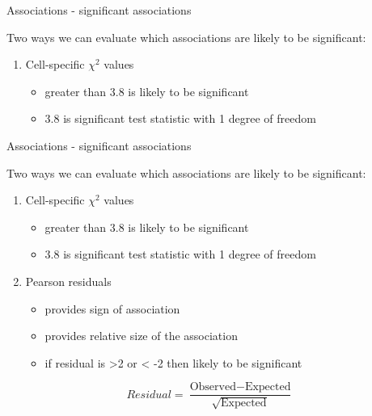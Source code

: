 \documentclass[
  ignorenonframetext,
  t]{beamer}
\providecommand{\tightlist}{%
  \setlength{\itemsep}{0pt}\setlength{\parskip}{0pt}}
\begin{document}
\begin{frame}{Associations - significant associations}
\protect\hypertarget{associations---significant-associations}{}

Two ways we can evaluate which associations are likely to be
significant:

\begin{enumerate}
\tightlist
\item
  Cell-specific \(\chi^2\) values

  \begin{itemize}
  \tightlist
  \item
    greater than 3.8 is likely to be significant
  \item
    3.8 is significant test statistic with 1 degree of freedom
  \end{itemize}
\end{enumerate}

\end{frame}

\begin{frame}{Associations - significant associations}
\protect\hypertarget{associations---significant-associations-1}{}

Two ways we can evaluate which associations are likely to be
significant:

\begin{enumerate}
\tightlist
\item
  Cell-specific \(\chi^2\) values

  \begin{itemize}
  \tightlist
  \item
    greater than 3.8 is likely to be significant
  \item
    3.8 is significant test statistic with 1 degree of freedom
  \end{itemize}
\item
  Pearson residuals

  \begin{itemize}
  \tightlist
  \item
    provides sign of association
  \item
    provides relative size of the association
  \item
    if residual is \textgreater2 or \textless{} -2 then likely to be
    significant
  \end{itemize}
\end{enumerate}

\[ Residual = \frac{\text{Observed}-\text{Expected}}{\sqrt{\text{Expected}}}\]

\end{frame}
\end{document}
